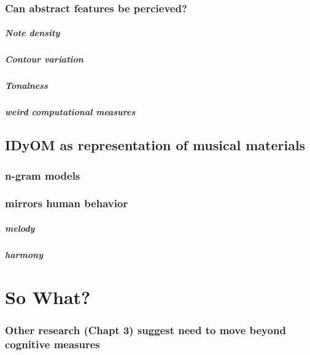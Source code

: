 \documentclass[]{book}
\let\oldsubparagraph\subparagraph
\renewcommand{\subparagraph}[1]{\oldsubparagraph{#1}\mbox{}}
\theoremstyle{definition}
\theoremstyle{definition}
\theoremstyle{definition}
\theoremstyle{remark}
\begin{document}
\hypertarget{can-abstract-features-be-percieved}{%
\subsubsection{Can abstract features be
percieved?}\label{can-abstract-features-be-percieved}}

\hypertarget{note-density}{%
\subparagraph{Note density}\label{note-density}}

\hypertarget{contour-variation}{%
\subparagraph{Contour variation}\label{contour-variation}}

\hypertarget{tonalness}{%
\subparagraph{Tonalness}\label{tonalness}}

\hypertarget{weird-computational-measures}{%
\subparagraph{weird computational
measures}\label{weird-computational-measures}}

\hypertarget{idyom-as-representation-of-musical-materials}{%
\subsection{IDyOM as representation of musical
materials}\label{idyom-as-representation-of-musical-materials}}

\hypertarget{n-gram-models}{%
\subsubsection{n-gram models}\label{n-gram-models}}

\hypertarget{mirrors-human-behavior}{%
\subsubsection{mirrors human behavior}\label{mirrors-human-behavior}}

\hypertarget{melody}{%
\subparagraph{melody}\label{melody}}

\hypertarget{harmony}{%
\subparagraph{harmony}\label{harmony}}

\hypertarget{so-what}{%
\section{So What?}\label{so-what}}

\hypertarget{other-research-chapt-3-suggest-need-to-move-beyond-cognitive-measures}{%
\subsubsection{Other research (Chapt 3) suggest need to move beyond
cognitive
measures}\label{other-research-chapt-3-suggest-need-to-move-beyond-cognitive-measures}}
\end{document}
